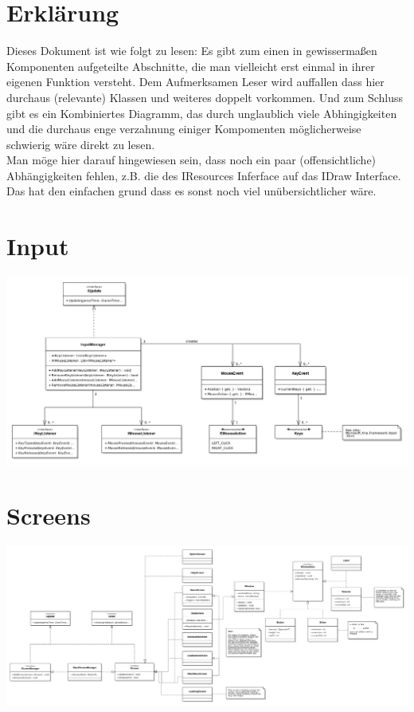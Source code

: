 \documentclass[12pt]{article}
\begin{document}
\tableofcontents
\newpage


\section{Erklärung}
Dieses Dokument ist wie folgt zu lesen: Es gibt zum einen in gewissermaßen
Komponenten aufgeteilte Abschnitte, die man vielleicht erst einmal in ihrer
eigenen Funktion versteht. Dem Aufmerksamen Leser wird auffallen dass hier
durchaus (relevante) Klassen und weiteres doppelt vorkommen. Und zum Schluss
gibt es ein Kombiniertes Diagramm, das durch unglaublich viele Abhingigkeiten
und die durchaus enge verzahnung einiger Kompomenten möglicherweise schwierig
wäre direkt zu lesen. \\

Man möge hier darauf hingewiesen sein, dass noch ein paar (offensichtliche)
Abhängigkeiten fehlen, z.B. die des IResources Inferface auf das IDraw
Interface. Das hat den einfachen grund dass es sonst noch viel
unübersichtlicher wäre.

\section{Input}
\includegraphics[width=\textwidth]{Input}
\newline

\section{Screens}
\includegraphics[width=\textwidth]{Screens}
\newline
\end{document}
